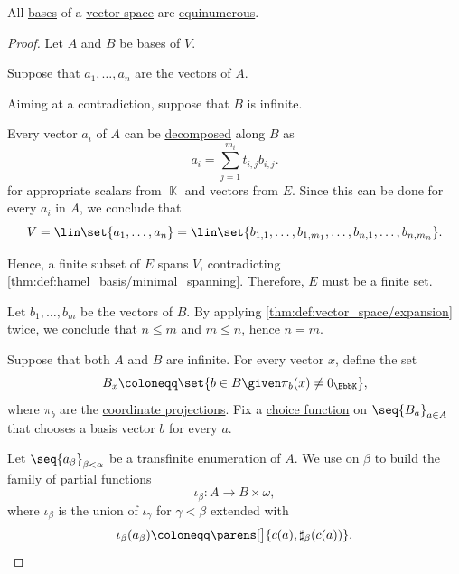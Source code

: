 \begin{proposition}\label{thm:vector_space_dimension}
  All \hyperref[def:hamel_basis]{bases} of a \hyperref[def:vector_space]{vector space} are \hyperref[def:equinumerosity]{equinumerous}.
\end{proposition}
\begin{proof}
  Let \( A \) and \( B \) be bases of \( V \).

   Suppose that \( a_1, \ldots, a_n \) are the vectors of \( A \).

   Aiming at a contradiction, suppose that \( B \) is infinite.

  Every vector \( a_i \) of \( A \) can be \hyperref[def:basis_decomposition]{decomposed} along \( B \) as
  \begin{equation*}
    a_i = \sum_{j=1}^{m_i} t_{i,j} b_{i,j}.
  \end{equation*}
  for appropriate scalars from \( \BbbK \) and vectors from \( E \). Since this can be done for every \( a_i \) in \( A \), we conclude that
  \begin{equation*}
    V = \lin\set{ a_1, \ldots, a_n } = \lin\set{ b_{1,1}, \ldots, b_{1,m_1}, \ldots, b_{n,1}, \ldots, b_{n,m_n} }.
  \end{equation*}

  Hence, a finite subset of \( E \) spans \( V \), contradicting \cref{thm:def:hamel_basis/minimal_spanning}. Therefore, \( E \) must be a finite set.

   Let \( b_1, \ldots, b_m \) be the vectors of \( B \). By applying \cref{thm:def:vector_space/expansion} twice, we conclude that \( n \leq m \) and \( m \leq n \), hence \( n = m \).

   Suppose that both \( A \) and \( B \) are infinite. For every vector \( x \), define the set
  \begin{equation*}
    B_x \coloneqq \set{ b \in B \given \pi_b(x) \neq 0_\BbbK },
  \end{equation*}
  where \( \pi_b \) are the \hyperref[def:basis_decomposition]{coordinate projections}. Fix a \hyperref[def:choice_function]{choice function} on \( \seq{ B_a }_{a \in A} \) that chooses a basis vector \( b \) for every \( a \).

  Let \( \seq{ a_\beta }_{\beta < \alpha} \) be a transfinite enumeration of \( A \). We use  on \( \beta \) to build the family of \hyperref[def:partial_function]{partial functions}
  \begin{equation*}
    \iota_\beta: A \to B \times \omega,
  \end{equation*}
  where \( \iota_\beta \) is the union of \( \iota_\gamma \) for \( \gamma < \beta \) extended with
  \begin{equation*}
    \iota_\beta(a_\beta) \coloneqq \parens[\big]{ c(a), \sharp_\beta(c(a)) }.
  \end{equation*}


\end{proof}

